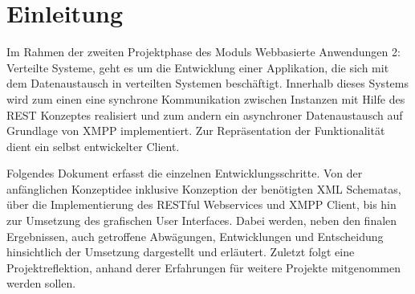 
\chapter{Einleitung}

Im Rahmen der zweiten Projektphase des Moduls Webbasierte Anwendungen 2: Verteilte Systeme,
geht es um die Entwicklung einer Applikation, die sich mit dem Datenaustausch in verteilten
Systemen beschäftigt. Innerhalb dieses Systems wird zum einen eine synchrone Kommunikation zwischen
Instanzen mit Hilfe des REST Konzeptes realisiert und zum andern ein asynchroner Datenaustausch
auf Grundlage von XMPP implementiert. Zur Repräsentation der Funktionalität dient ein selbst
entwickelter Client.

\vspace{0.2cm}

Folgendes Dokument erfasst die einzelnen Entwicklungsschritte. Von der anfänglichen Konzeptidee
inklusive Konzeption der benötigten XML Schematas, über die Implementierung des RESTful Webservices
und XMPP Client, bis hin zur Umsetzung des grafischen User Interfaces. Dabei werden, neben den
finalen Ergebnissen, auch getroffene Abwägungen, Entwicklungen und Entscheidung hinsichtlich der
Umsetzung dargestellt und erläutert.
Zuletzt folgt eine Projektreflektion, anhand derer Erfahrungen für weitere Projekte mitgenommen werden sollen.
